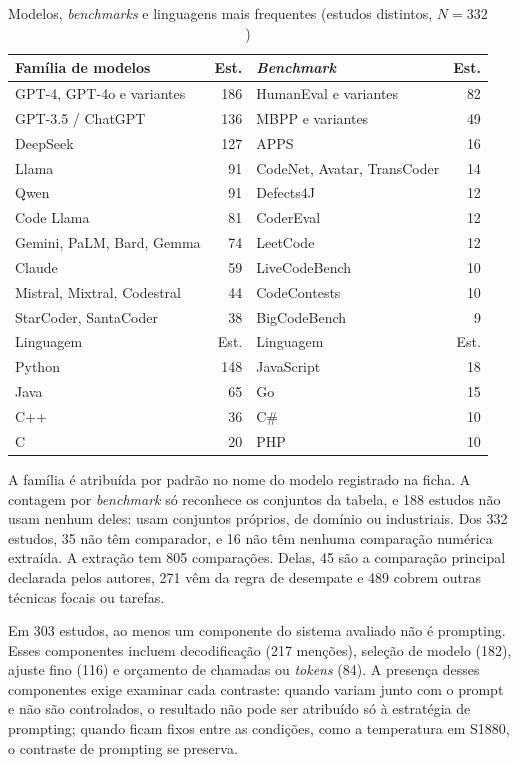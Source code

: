 \begin{table}[!t]
\caption{Modelos, \textit{benchmarks} e linguagens mais frequentes (estudos distintos, $N = 332$)}\label{tab:corpus}
\centering\footnotesize
\begin{tabular}{@{}lr@{\hspace{10pt}}lr@{}}
\hline
Família de modelos & Est. & \textit{Benchmark} & Est.\\
\hline
GPT-4, GPT-4o e variantes & 186 & HumanEval e variantes & 82\\
GPT-3.5 / ChatGPT & 136 & MBPP e variantes & 49\\
DeepSeek & 127 & APPS & 16\\
Llama & 91 & CodeNet, Avatar, TransCoder & 14\\
Qwen & 91 & Defects4J & 12\\
Code Llama & 81 & CoderEval & 12\\
Gemini, PaLM, Bard, Gemma & 74 & LeetCode & 12\\
Claude & 59 & LiveCodeBench & 10\\
Mistral, Mixtral, Codestral & 44 & CodeContests & 10\\
StarCoder, SantaCoder & 38 & BigCodeBench & 9\\
\hline
Linguagem & Est. & Linguagem & Est.\\
\hline
Python & 148 & JavaScript & 18\\
Java & 65 & Go & 15\\
C++ & 36 & C\# & 10\\
C & 20 & PHP & 10\\
\hline
\end{tabular}
\end{table}

A família é atribuída por padrão no nome do modelo registrado na ficha. A contagem por \textit{benchmark} só
reconhece os conjuntos da tabela, e 188 estudos não usam nenhum deles: usam conjuntos próprios, de domínio ou
industriais. Dos 332 estudos, 35 não têm comparador, e 16 não têm nenhuma comparação numérica extraída. A
extração tem 805 comparações. Delas, 45 são a comparação principal declarada pelos autores, 271 vêm da regra de
desempate e 489 cobrem outras técnicas focais ou tarefas.

Em 303 estudos, ao menos um componente do sistema avaliado não é prompting. Esses componentes incluem decodificação
(217 menções), seleção de modelo (182), ajuste fino (116) e orçamento de chamadas ou \textit{tokens} (84). A presença desses componentes exige examinar
cada contraste: quando variam junto com o prompt e não são controlados, o resultado não pode ser atribuído só à
estratégia de prompting; quando ficam fixos entre as condições, como a temperatura em S1880, o contraste de
prompting se preserva.


